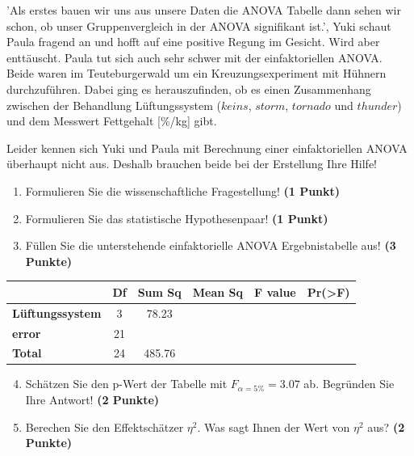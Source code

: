 \documentclass[a4paper, 9pt]{scrartcl}\usepackage[]{graphicx}\usepackage[]{xcolor}
\begin{document}
'Als erstes bauen wir uns aus unsere Daten die ANOVA Tabelle dann sehen wir schon, ob unser Gruppenvergleich in der ANOVA signifikant ist.', Yuki schaut Paula fragend an und hofft auf eine positive Regung im Gesicht. Wird aber enttäuscht. Paula tut sich auch sehr schwer mit der einfaktoriellen ANOVA. Beide waren im Teuteburgerwald um ein Kreuzungsexperiment mit Hühnern durchzuführen. Dabei ging es herauszufinden, ob es einen Zusammenhang zwischen der Behandlung Lüftungssystem ($keins$, $storm$, $tornado$ und $thunder$) und dem Messwert Fettgehalt [\%/kg] gibt.



\vspace{1ex}

Leider kennen sich Yuki und Paula mit Berechnung einer einfaktoriellen ANOVA überhaupt nicht aus. Deshalb brauchen beide bei der Erstellung Ihre Hilfe! 

\begin{enumerate}
  \item Formulieren Sie die wissenschaftliche Fragestellung! \textbf{(1 Punkt)}
  \item Formulieren Sie das statistische Hypothesenpaar! \textbf{(1 Punkt)}
\item Füllen Sie die unterstehende einfaktorielle ANOVA Ergebnistabelle aus! \textbf{(3 Punkte)}
\end{enumerate}

\vspace{1Ex}

\begin{center}
  \Large
  \begin{tabular}{lccccp{3cm}}
\toprule
     & \textbf{Df} & \textbf{Sum Sq} & \textbf{Mean Sq} & \textbf{F value} & \textbf{Pr(>F)} \strut\\
    \midrule
   \textbf{Lüftungssystem}  & 3 & 78.23 &  &  &  \strut\\
   \textbf{error}  & 21 &  &  &  &  \strut\\
   \textbf{Total}  & 24 & 485.76 &  &  &  \strut\\
\bottomrule
  \end{tabular}
\end{center}

\vspace{1Ex}

\begin{enumerate}
  \setcounter{enumi}{3}
\item Schätzen Sie den p-Wert der Tabelle mit $F_{\alpha = 5\%} = 3.07$ ab. Begründen Sie Ihre Antwort! \textbf{(2 Punkte)}
\item Berechen Sie den Effektschätzer $\eta^2$. Was sagt Ihnen der Wert von $\eta^2$ aus? \textbf{(2 Punkte)}
\end{enumerate}
\end{document}
